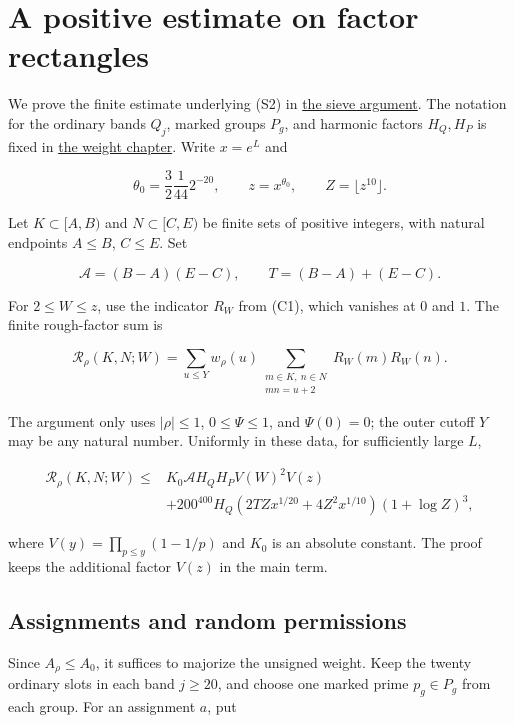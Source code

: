 \hypertarget{rectangles}{%
\section{A positive estimate on factor rectangles}\label{rectangles}}

We prove the finite estimate underlying (S2) in
\protect\hyperlink{sieve}{the sieve argument}. The notation for the
ordinary bands \(Q_j\), marked groups \(P_g\), and harmonic factors
\(H_Q,H_P\) is fixed in \protect\hyperlink{weights}{the weight chapter}.
Write \(x=e^L\) and

\[
\theta_0=\frac32\frac1{44}2^{-20},\qquad z=x^{\theta_0},\qquad
Z=\lfloor z^{10}\rfloor.
\]

Let \(K\subset[A,B)\) and \(N\subset[C,E)\) be finite sets of positive
integers, with natural endpoints \(A\le B\), \(C\le E\). Set

\[
\mathcal A=(B-A)(E-C),\qquad T=(B-A)+(E-C).
\]

For \(2\le W\le z\), use the indicator \(R_W\) from (C1), which vanishes
at \(0\) and \(1\). The finite rough-factor sum is

\[
\mathcal R_\rho(K,N;W)
=\sum_{u\le Y}w_\rho(u)
 \sum_{\substack{m\in K,\ n\in N\\mn=u+2}}
 R_W(m)R_W(n).
\]

The argument only uses \(|\rho|\le1\), \(0\le\Psi\le1\), and
\(\Psi(0)=0\); the outer cutoff \(Y\) may be any natural number.
Uniformly in these data, for sufficiently large \(L\),

\[
\begin{aligned}
\mathcal R_\rho(K,N;W)\le{}&
 K_0\mathcal A H_QH_PV(W)^2V(z)\\
&+200^{400}H_Q
 \left(2TZx^{1/20}+4Z^2x^{1/10}\right)(1+\log Z)^3,
\end{aligned} \tag{R1}
\]

where \(V(y)=\prod_{p\le y}(1-1/p)\) and \(K_0\) is an absolute
constant. The proof keeps the additional factor \(V(z)\) in the main
term.


\hypertarget{rectangles-assignments-and-random-permissions}{%
\subsection{Assignments and random
permissions}\label{rectangles-assignments-and-random-permissions}}

Since \(A_\rho\le A_0\), it suffices to majorize the unsigned weight.
Keep the twenty ordinary slots in each band \(j\ge20\), and choose one
marked prime \(p_g\in P_g\) from each group. For an assignment \(a\),
put

